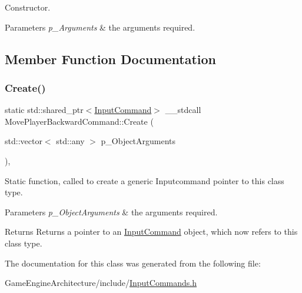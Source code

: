 Constructor. 


\begin{DoxyParams}{Parameters}
{\em p\+\_\+\+Arguments} & the arguments required. \\
\hline
\end{DoxyParams}


\subsection{Member Function Documentation}
\mbox{\label{class_move_player_backward_command_aff6b8aaa19742d29f54eedfdd3856f6c}} 
\subsubsection{\texorpdfstring{Create()}{Create()}}
{\footnotesize\ttfamily static std\+::shared\+\_\+ptr$<$\mbox{\hyperlink{class_input_command}{Input\+Command}}$>$ \+\_\+\+\_\+stdcall Move\+Player\+Backward\+Command\+::\+Create (\begin{DoxyParamCaption}\item[{std\+::vector$<$ std\+::any $>$}]{p\+\_\+\+Object\+Arguments }\end{DoxyParamCaption})\hspace{0.3cm}{\ttfamily [inline]}, {\ttfamily [static]}}



Static function, called to create a generic Inputcommand pointer to this class type. 


\begin{DoxyParams}{Parameters}
{\em p\+\_\+\+Object\+Arguments} & the arguments required. \\
\hline
\end{DoxyParams}
\begin{DoxyReturn}{Returns}
Returns a pointer to an \mbox{\hyperlink{class_input_command}{Input\+Command}} object, which now refers to this class type. 
\end{DoxyReturn}


The documentation for this class was generated from the following file\+:\begin{DoxyCompactItemize}
\item 
Game\+Engine\+Architecture/include/\mbox{\hyperlink{_input_commands_8h}{Input\+Commands.\+h}}\end{DoxyCompactItemize}
